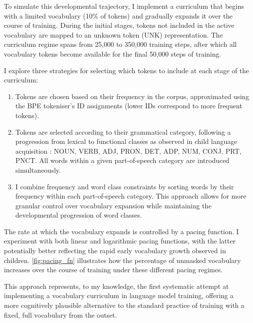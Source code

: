 To simulate this developmental trajectory, I implement a curriculum that begins with a limited vocabulary (10\% of tokens) and gradually expands it over the course of training. During the initial stages, tokens not included in the active vocabulary are mapped to an unknown token (\textsc{UNK}) representation. The curriculum regime spans from 25,000 to 350,000 training steps, after which all vocabulary tokens become available for the final 50,000 steps of training.

I explore three strategies for selecting which tokens to include at each stage of the curriculum:

\begin{enumerate}
    \item {} Tokens are chosen based on their frequency in the corpus, approximated using the BPE tokeniser's ID assignments (lower IDs correspond to more frequent tokens).
    
    \item {} Tokens are selected according to their grammatical category, following a progression from lexical to functional classes as observed in child language acquisition \citep{bergelson2015early}: NOUN, VERB, ADJ, PRON, DET, ADP, NUM, CONJ, PRT, PNCT. All words within a given part-of-speech category are introduced simultaneously.
    
    \item {} I combine frequency and word class constraints by sorting words by their frequency within each part-of-speech category. This approach allows for more granular control over vocabulary expansion while maintaining the developmental progression of word classes.
\end{enumerate}

The rate at which the vocabulary expands is controlled by a pacing function. I experiment with both linear and logarithmic pacing functions, with the latter potentially better reflecting the rapid early vocabulary growth observed in children. \cref{fig:pacing_fn} illustrates how the percentage of unmasked vocabulary increases over the course of training under these different pacing regimes.


This approach represents, to my knowledge, the first systematic attempt at implementing a vocabulary curriculum in language model training, offering a more cognitively plausible alternative to the standard practice of training with a fixed, full vocabulary from the outset.


